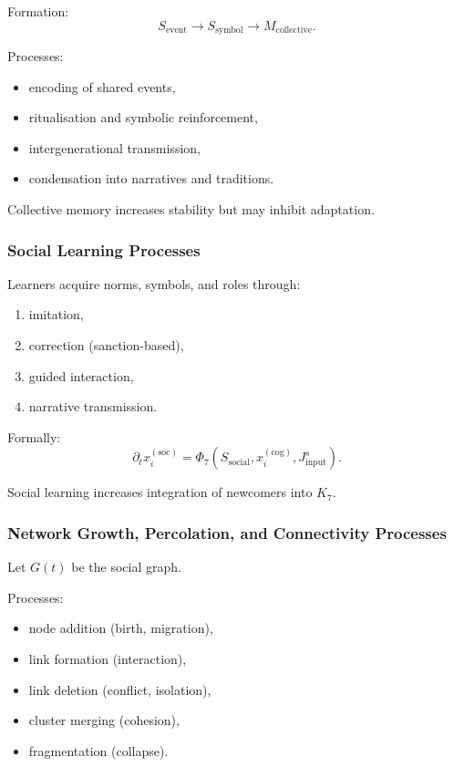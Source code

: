 Formation:
\[
S_{\text{event}} \to S_{\text{symbol}} \to M_{\text{collective}}.
\]

Processes:
\begin{itemize}
    \item encoding of shared events,
    \item ritualisation and symbolic reinforcement,
    \item intergenerational transmission,
    \item condensation into narratives and traditions.
\end{itemize}

Collective memory increases stability but may inhibit adaptation.

\subsubsection{Social Learning Processes}

Learners acquire norms, symbols, and roles through:
\begin{enumerate}
    \item imitation,
    \item correction (sanction-based),
    \item guided interaction,
    \item narrative transmission.
\end{enumerate}

Formally:
\[
\partial_t x_i^{(\text{soc})} 
= \Phi_7(S_{\text{social}}, x_i^{(\text{cog})}, J^{s}_{\text{input}}).
\]

Social learning increases integration of newcomers into $K_7$.

\subsubsection{Network Growth, Percolation, and Connectivity Processes}

Let $G(t)$ be the social graph.

Processes:
\begin{itemize}
    \item node addition (birth, migration),
    \item link formation (interaction),
    \item link deletion (conflict, isolation),
    \item cluster merging (cohesion),
    \item fragmentation (collapse).
\end{itemize}

